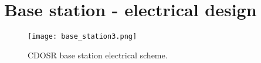 \section{Base station - electrical design}\label{AEE2}

\begin{figure}[h]
    \centering
    \texttt{[image: base\_station3.png]}
    \caption{\small{CDOSR base station electrical scheme.}}
\end{figure}
    
